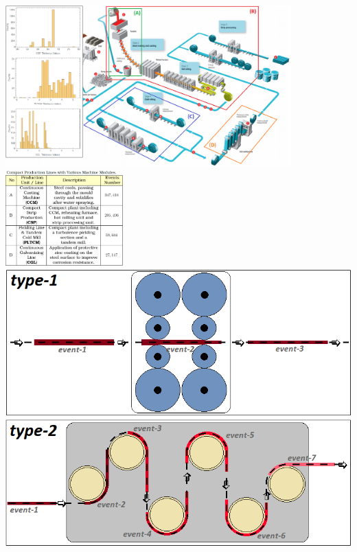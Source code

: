 \begin{frame}
	\begin{columns}[c]
		\hspace{-1.2cm}\includegraphics[width=11cm]{../tables/steel-production-steps_old_2.png}
		\hspace{6cm}\centering\includegraphics[height=3.7cm]{../tables/production_lines.png}
		\includegraphics[width=\linewidth]{../tables/production_lines_handling_types_2.png}
	\end{columns}
\end{frame}

